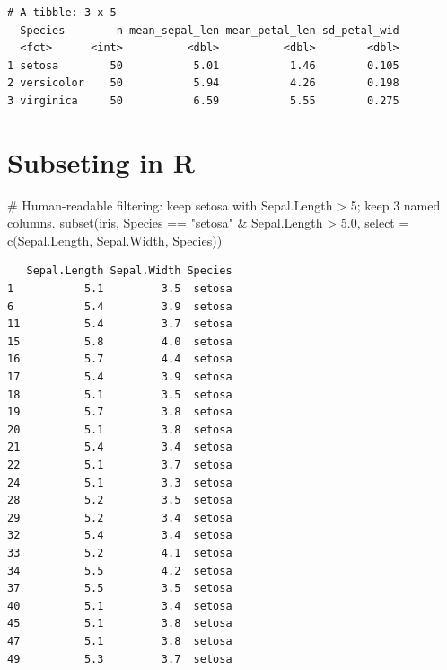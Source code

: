 \documentclass[
  letterpaper,
  DIV=11,
  numbers=noendperiod]{scrreprt}
\newenvironment{Shaded}{\begin{snugshade}}{\end{snugshade}}
\newcommand{\AttributeTok}[1]{\textcolor[rgb]{0.40,0.45,0.13}{#1}}
\newcommand{\CommentTok}[1]{\textcolor[rgb]{0.37,0.37,0.37}{#1}}
\newcommand{\FloatTok}[1]{\textcolor[rgb]{0.68,0.00,0.00}{#1}}
\newcommand{\FunctionTok}[1]{\textcolor[rgb]{0.28,0.35,0.67}{#1}}
\newcommand{\NormalTok}[1]{\textcolor[rgb]{0.00,0.23,0.31}{#1}}
\newcommand{\SpecialCharTok}[1]{\textcolor[rgb]{0.37,0.37,0.37}{#1}}
\newcommand{\StringTok}[1]{\textcolor[rgb]{0.13,0.47,0.30}{#1}}
\begin{document}
\begin{verbatim}
# A tibble: 3 x 5
  Species        n mean_sepal_len mean_petal_len sd_petal_wid
  <fct>      <int>          <dbl>          <dbl>        <dbl>
1 setosa        50           5.01           1.46        0.105
2 versicolor    50           5.94           4.26        0.198
3 virginica     50           6.59           5.55        0.275
\end{verbatim}

\section{Subseting in R}\label{subseting-in-r}

\begin{Shaded}
\begin{Highlighting}[]
\CommentTok{\# Human{-}readable filtering: keep setosa with Sepal.Length \textgreater{} 5; keep 3 named columns.}
\FunctionTok{subset}\NormalTok{(iris, Species }\SpecialCharTok{==} \StringTok{"setosa"} \SpecialCharTok{\&}\NormalTok{ Sepal.Length }\SpecialCharTok{\textgreater{}} \FloatTok{5.0}\NormalTok{,}
       \AttributeTok{select =} \FunctionTok{c}\NormalTok{(Sepal.Length, Sepal.Width, Species))}
\end{Highlighting}
\end{Shaded}

\begin{verbatim}
   Sepal.Length Sepal.Width Species
1           5.1         3.5  setosa
6           5.4         3.9  setosa
11          5.4         3.7  setosa
15          5.8         4.0  setosa
16          5.7         4.4  setosa
17          5.4         3.9  setosa
18          5.1         3.5  setosa
19          5.7         3.8  setosa
20          5.1         3.8  setosa
21          5.4         3.4  setosa
22          5.1         3.7  setosa
24          5.1         3.3  setosa
28          5.2         3.5  setosa
29          5.2         3.4  setosa
32          5.4         3.4  setosa
33          5.2         4.1  setosa
34          5.5         4.2  setosa
37          5.5         3.5  setosa
40          5.1         3.4  setosa
45          5.1         3.8  setosa
47          5.1         3.8  setosa
49          5.3         3.7  setosa
\end{verbatim}

\begin{Shaded}
\end{Shaded}
\end{document}
